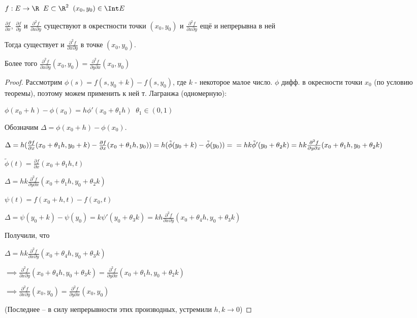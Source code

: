 \begin{theorem}\slashns
	
	$f: E \to \R \;\; E\subset \R^2 \;\; (x_0, y_0)  \in \Int E$
	
	$\frac{\partial f}{\partial x} $,
	$\frac{\partial f}{\partial y} $ и 
	$\frac{\partial^2 f}{\partial x \partial y} $ 
	существуют в окрестности точки $(x_0, y_0)$ и $\frac{\partial^2 f}{\partial x \partial y} $ ещё и непрерывна в ней
	
	
	Тогда существует и $\frac{\partial^2 f}{\partial x \partial y}$ в точке $(x_0, y_0)$. 

	Более того $\frac{\partial^2 f}{\partial x \partial y}(x_0, y_0) = \frac{\partial^2 f}{\partial y \partial x}(x_0, y_0)$
\end{theorem}

\begin{proof}\slashns

	Рассмотрим $\phi(s) = f(s, y_0 + k) - f(s, y_0)$, где $k$ - некоторое малое число. 
	$\phi$ дифф. в окресности точки $x_0$ (по условию теоремы), поэтому можем применить к ней т. Лагранжа (одномерную):
	
	$\phi(x_0 + h) - \phi(x_0) = h \phi'(x_0 + \theta_1 h) \;\; \theta_1 \in (0,1)$

	Обозначим $\Delta = \phi(x_0 + h) - \phi(x_0)$. 

	$\Delta = h(\frac{\partial f}{\partial x} (x_0 + \theta_1 h, y_0 + k) - \frac{\partial f}{\partial x}(x_0 + \theta_1h, y_0)) = h(\tilde{\phi}(y_0+k) - \tilde{\phi}(y_0)) =\\= hk\tilde{\phi}'(y_0 + \theta_2 k) = hk \frac{\partial^2 f}{\partial y \partial x} (x_0 + \theta_1 h, y_0 + \theta_2 k)$
	
	
	$\tilde{\phi}(t) = \frac{\partial f}{\partial x} (x_0 + \theta_1 h, t)$

	
	$\Delta = hk \frac{\partial^2 f}{\partial y \partial x} (x_0 + \theta_1 h, y_0 + \theta_2 k)$
	
	$\psi(t) = f(x_0 + h, t) - f(x_0, t)$
	
	$\Delta = \psi(y_0 + k) - \psi(y_0) = k\psi'(y_0 + \theta_3 k) = kh\frac{\partial^2 f}{\partial x \partial y}(x_0 + \theta_4 h, y_0 + \theta_3 k) $
	
	Получили, что
	
	$\Delta = hk \frac{\partial^2 f}{\partial x \partial y} (x_0 + \theta_4 h, y_0 + \theta_3 k)$
	
	$\implies \frac{\partial^2 f}{\partial x \partial y} (x_0 + \theta_4 h, y_0 + \theta_3 k) =\frac{\partial^2 f}{\partial y \partial x} (x_0 + \theta_1 h, y_0 + \theta_2 k) $
	
	$\implies  \frac{\partial^2 f}{\partial x \partial y} (x_0, y_0) =\frac{\partial^2 f}{\partial y \partial x} (x_0, y_0) $
	
	(Последнее -- в силу непрерывности этих производных, устремили $h,k\to 0$)
	
\end{proof}

